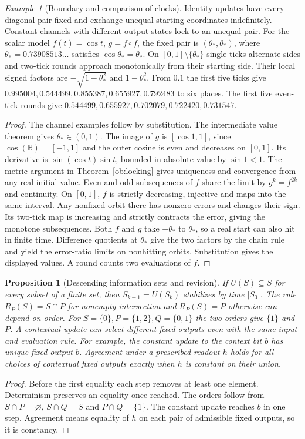 \documentclass[aps,pra,onecolumn,superscriptaddress,nofootinbib,10pt]{revtex4-2}
\newtheorem{proposition}[theorem]{Proposition}
\theoremstyle{definition}
\theoremstyle{remark}
\newtheorem{example}[theorem]{Example}
\newcommand{\R}{\mathbb{R}}
\begin{document}
\begin{example}[Boundary and comparison of clocks]\label{ob:cosine}
Identity updates have every diagonal pair fixed and exchange unequal
starting coordinates indefinitely. Constant channels with different
output states lock to an unequal pair. For the scalar model
$f(t)=\cos t$, $g=f\circ f$, the fixed pair is $(\theta_*,\theta_*)$,
where $\theta_*=0.73908513\ldots$ satisfies $\cos\theta_*=\theta_*$.
On $[0,1]\setminus\{\theta_*\}$ single ticks alternate sides and
two-tick rounds approach monotonically from their starting side.
Their local signed factors are $-\sqrt{1-\theta_*^2}$ and $1-\theta_*^2$.
From $0.1$ the first five ticks give
$0.995004,0.544499,0.855387,0.655927,0.792483$ to six places.
The first five even-tick rounds give
$0.544499,0.655927,0.702079,0.722420,0.731547$.
\end{example}
\begin{proof}
The channel examples follow by substitution. The intermediate value
theorem gives $\theta_*\in(0,1)$. The image of $g$ is $[\cos1,1]$,
since $\cos(\R)=[-1,1]$ and the outer cosine is even and decreases on
$[0,1]$. Its derivative is $\sin(\cos t)\sin t$, bounded in
absolute value by $\sin1<1$. The metric argument in
Theorem~\ref{ob:locking} gives uniqueness and convergence from any real
initial value. Even and odd subsequences of $f$ share the limit by
$g^k=f^{2k}$ and continuity. On $[0,1]$, $f$ is strictly decreasing,
injective and maps into the same interval. Any nonfixed orbit there
has nonzero errors and changes their sign. Its two-tick map is
increasing and strictly contracts the error, giving the monotone
subsequences. Both $f$ and $g$ take $-\theta_*$ to $\theta_*$, so a
real start can also hit in finite time. Difference quotients at
$\theta_*$ give the two factors by the chain rule and yield the
error-ratio limits on nonhitting orbits. Substitution gives the
displayed values. A round counts two evaluations of $f$.
\end{proof}

\begin{proposition}[Descending information sets and revision]\label{ob:finiterevision}
If $U(S)\subseteq S$ for every subset of a finite set, then
$S_{k+1}=U(S_k)$ stabilizes by time $|S_0|$. The rule
$R_P(S)=S\cap P$ for nonempty intersection and $R_P(S)=P$ otherwise
can depend on order. For $S=\{0\},P=\{1,2\},Q=\{0,1\}$ the two orders
give $\{1\}$ and $P$. A contextual update can select different fixed
outputs even with the same input and evaluation rule. For example,
the constant update to the context bit $b$ has unique fixed output $b$.
Agreement under a prescribed readout $h$ holds for all choices of
contextual fixed outputs exactly when $h$ is constant on their union.
\end{proposition}
\begin{proof}
Before the first equality each step removes at least one element.
Determinism preserves an equality once reached. The orders follow
from $S\cap P=\varnothing$, $S\cap Q=S$ and $P\cap Q=\{1\}$.
The constant update reaches $b$ in one step. Agreement means equality
of $h$ on each pair of admissible fixed outputs, so it is constancy.
\end{proof}
\end{document}
